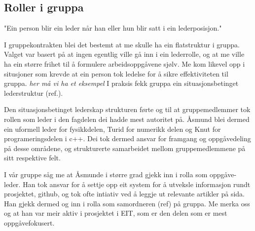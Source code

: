 \subsection{Roller i gruppa}
"Ein person blir ein leder når han eller hun blir satt i ein lederposisjon."


I gruppekontrakten blei det bestemt at me skulle ha ein flatstruktur i gruppa. Valget var basert på at ingen egentlig ville gå inn i ein lederrolle, og at me ville ha ein større frihet til å formulere arbeidsoppgåvene sjølv. Me kom likevel opp i situsjoner som krevde at ein person tok ledelse for å sikre effektiviteten til gruppa. \emph{her må vi ha et eksempel} I praksis fekk gruppa ein situasjonsbetinget lederstruktur (ref.).

Den situasjonsbetinget lederskap strukturen førte og til at gruppemedlemmer tok rollen som leder i den fagdelen dei hadde mest autoritet på. Åsmund blei dermed ein uformell leder for fysikkdelen, Turid for numerikk delen og Knut for programeringsdelen i c++. Dei tok dermed ansvar for framgang og oppgåvedeling på desse områdene, og strukturerte samarbeidet mellom gruppemedlemmene på sitt respektive felt. 

I vår gruppe såg me at Åsmunde i større grad gjekk inn i rolla som oppgåve-leder. Han tok ansvar for å settje opp eit system for å utveksle informasjon rundt prosjektet, github, og tok ofte intiativ ved å leggje ut relevante artikler på sida. Han gjekk dermed og inn i rolla som  samordneren (ref) på gruppa. Me merka oss og at han var meir aktiv i prosjektet i EIT, som er den delen som er mest oppgåvefokusert. 

